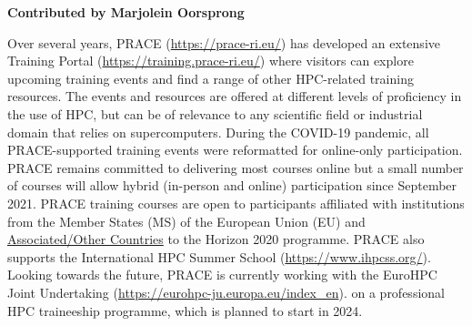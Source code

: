 \textbf{Contributed by Marjolein Oorsprong}

Over several years, PRACE (\href{https://prace-ri.eu/}{https://prace-ri.eu/}) has developed an extensive Training Portal (\href{https://training.prace-ri.eu/}{https://training.prace-ri.eu/}) where visitors can explore upcoming training events and find a range of other HPC-related training resources.
The events and resources are offered at different levels of proficiency in the use of HPC, but can be of relevance to any scientific field or industrial domain that relies on supercomputers.
During the COVID-19 pandemic, all PRACE-supported training events were reformatted for online-only participation. 
PRACE remains committed to delivering most courses online but a small number of courses will allow hybrid (in-person and online) participation since September 2021.
PRACE training courses are open to participants affiliated with institutions from the Member States (MS) of the European Union (EU) and \href{https://ec.europa.eu/info/research-and-innovation/statistics/framework-programme-facts-and-figures/horizon-2020-country-profiles_en}{Associated/Other Countries} to the Horizon 2020 programme.
PRACE also supports the International HPC Summer School (\href{https://www.ihpcss.org/}{https://www.ihpcss.org/}).
Looking towards the future, PRACE is currently working with the EuroHPC Joint Undertaking 
(\href{https://eurohpc-ju.europa.eu/index_en}{https://eurohpc-ju.europa.eu/index\_en}).
on a professional HPC traineeship programme, which is planned to start in 2024.